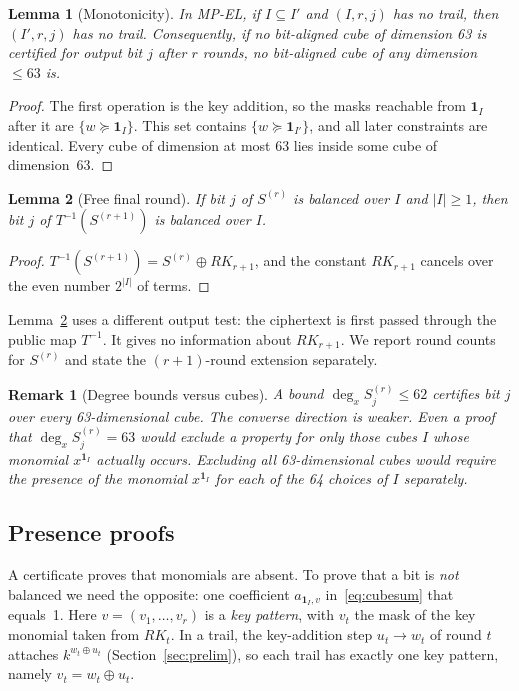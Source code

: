\documentclass[pdflatex,sn-mathphys-num]{sn-jnl}
\theoremstyle{thmstyleone}
\newtheorem{lemma}{Lemma}
\theoremstyle{thmstylethree}
\theoremstyle{thmstyletwo}
\newtheorem{remark}{Remark}
\newcommand{\MPEL}{\textsf{MP-EL}}
\begin{document}
\begin{lemma}[Monotonicity]\label{lem:mono}
In \MPEL, if $I\subseteq I'$ and $(I,r,j)$ has no trail, then $(I',r,j)$ has no trail. Consequently, if no bit-aligned cube of dimension 63 is certified for output bit $j$ after $r$ rounds, no bit-aligned cube of any dimension $\le63$ is.
\end{lemma}
\begin{proof}
The first operation is the key addition, so the masks reachable from $\mathbf 1_I$ after it are $\{w\succeq\mathbf 1_I\}$. This set contains $\{w\succeq\mathbf 1_{I'}\}$, and all later constraints are identical. Every cube of dimension at most 63 lies inside some cube of dimension~63.
\end{proof}

\begin{lemma}[Free final round]\label{lem:free}
If bit $j$ of $S^{(r)}$ is balanced over $I$ and $|I|\ge1$, then bit $j$ of $T^{-1}(S^{(r+1)})$ is balanced over $I$.
\end{lemma}
\begin{proof}
$T^{-1}(S^{(r+1)})=S^{(r)}\oplus RK_{r+1}$, and the constant $RK_{r+1}$ cancels over the even number $2^{|I|}$ of terms.
\end{proof}
Lemma~\ref{lem:free} uses a different output test: the ciphertext is first passed through the public map $T^{-1}$. It gives no information about $RK_{r+1}$. We report round counts for $S^{(r)}$ and state the $(r{+}1)$-round extension separately.

\begin{remark}[Degree bounds versus cubes]\label{rem:percube}
A bound $\deg_x S^{(r)}_j\le62$ certifies bit $j$ over \emph{every} 63-dimensional cube. The converse direction is weaker. Even a proof that $\deg_x S^{(r)}_j=63$ would exclude a property for only those cubes $I$ whose monomial $x^{\mathbf 1_I}$ actually occurs. Excluding all 63-dimensional cubes would require the presence of the monomial $x^{\mathbf 1_{I}}$ for each of the 64 choices of $I$ separately.
\end{remark}

\subsection{Presence proofs}\label{sec:presence}
A certificate proves that monomials are absent. To prove that a bit is \emph{not} balanced we need the opposite: one coefficient $a_{\mathbf 1_I,v}$ in~\eqref{eq:cubesum} that equals~1. Here $v=(v_1,\dots,v_r)$ is a \emph{key pattern}, with $v_t$ the mask of the key monomial taken from $RK_t$. In a trail, the key-addition step $u_t\to w_t$ of round $t$ attaches $k^{w_t\oplus u_t}$ (Section~\ref{sec:prelim}), so each trail has exactly one key pattern, namely $v_t=w_t\oplus u_t$.
\end{document}
